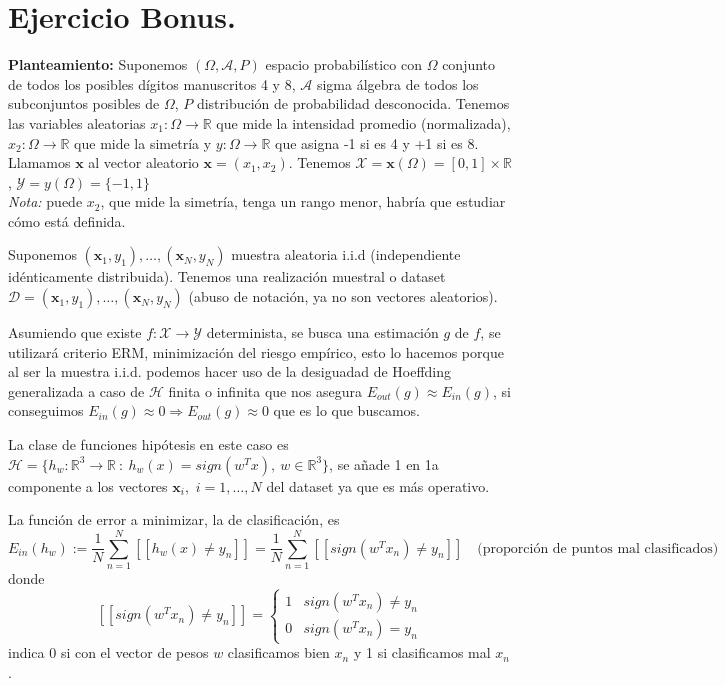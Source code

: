 \documentclass[11pt,a4paper]{article}
\theoremstyle{definition}
\newcommand{\R}{\mathbb{R}}
\begin{document}
	\newpage
	\section{Ejercicio Bonus.}
	\textbf{Planteamiento:} Suponemos $(\Omega,\mathcal{A},P)$ espacio probabilístico con $\Omega$ conjunto de todos los posibles dígitos manuscritos 4 y 8, $\mathcal{A}$ sigma álgebra de todos los subconjuntos posibles de $\Omega$, $P$ distribución de probabilidad desconocida. Tenemos las variables aleatorias $x_1\colon \Omega \to \R$ que mide la intensidad promedio (normalizada), $x_2\colon \Omega \to  \R$ que mide la simetría y $y\colon \Omega \to \R$ que asigna -1 si es 4 y +1 si es 8. Llamamos $\mathbf{x}$ al vector aleatorio $\mathbf{x}=(x_1,x_2)$. Tenemos $\mathcal{X}=\mathbf{x}(\Omega)=[0,1]\times \R$, $\mathcal{Y}=y(\Omega)=\{-1,1\}$\\
	\textit{Nota:} puede $x_2$, que mide la simetría, tenga un rango menor, habría que estudiar cómo está definida.
	
	Suponemos $(\mathbf{x}_1,y_1),\ldots,(\mathbf{x}_N,y_N)$ muestra aleatoria i.i.d (independiente idénticamente distribuida). Tenemos una realización muestral o dataset $\mathcal{D}=(\mathbf{x}_1,y_1),\ldots,(\mathbf{x}_N,y_N)$ (abuso de notación, ya no son vectores aleatorios). 
	
	Asumiendo que existe $f\colon \mathcal{X}\to \mathcal{Y}$ determinista, se busca una estimación $g$ de $f$, se utilizará criterio ERM, minimización del riesgo empírico, esto lo hacemos porque al ser la muestra i.i.d. podemos hacer uso de la desiguadad de Hoeffding generalizada a caso de $\mathcal{H}$ finita o infinita que nos asegura  $E_{out}(g)\approx E_{in}(g)$, si conseguimos $E_{in}(g)\approx 0 \Rightarrow E_{out}(g)\approx 0$ que es lo que buscamos. 
	
	La clase de funciones hipótesis en este caso es 
	$\mathcal{H}=\{h_w\colon \R^{3} \to \R \ : \ h_w(x) = sign(w^Tx), \ w \in \R^{3}\}$, se añade 1 en 1a componente a los vectores $\mathbf{x}_i,$ $i=1,\ldots,N$ del dataset ya que es más operativo. 
	
	La función de error a minimizar, la de clasificación, es
	$$E_{in}(h_w):=\frac{1}{N} \sum_{n=1}^N [[h_w(x)\neq y_n]]= \frac{1}{N} \sum_{n=1}^N [[sign(w^Tx_n)\neq y_n]] \quad \text{(proporción de puntos mal clasificados)}$$
	donde 
	$$[[sign(w^T x_n) \neq y_n]] = \begin{cases}
	1 & sign(w^T x_n)\neq y_n\\
	0 & sign(w^T x_n) = y_n
	\end{cases}
	$$
	indica 0 si con el vector de pesos $w$ clasificamos bien $x_n$ y 1 si clasificamos mal $x_n$.
	
\end{document}
